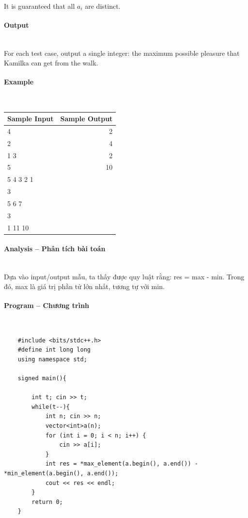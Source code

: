 \documentclass{article}
\begin{document}
It is guaranteed that all $a_i$ are distinct.
\paragraph{Output}\mbox{} \\

For each test case, output a single integer: the maximum possible pleasure that Kamilka can get from the walk.

\paragraph{Example}\mbox{} \\

\begin{table}[h]
    \centering
    \begin{tabular}{|l|r|}
        \hline
        \textbf{Sample Input} & \textbf{Sample Output} \\
        \hline
		4& 2 \\ 
		2& 4 \\ 
		1 3& 2 \\ 
		5& 10 \\ 
		5 4 3 2 1&  \\
		3&  \\ 
		5 6 7&  \\ 
		3&  \\ 
		1 11 10&  \\ 
		 \hline
    \end{tabular}
\end{table}

\paragraph{Analysis -- Phân tích bài toán} \mbox{} \\

Dựa vào input/output mẫu, ta thấy được quy luật rằng: res = max - min. Trong đó, max là giá trị phần tử lớn nhất, tương tự với min.


\paragraph{Program -- Chương trình} \mbox{} \\

\begin{lstlisting}
	#include <bits/stdc++.h>
	#define int long long
	using namespace std;
	
	signed main(){
	
		int t; cin >> t;
		while(t--){
			int n; cin >> n;
			vector<int>a(n);
			for (int i = 0; i < n; i++) {
				cin >> a[i];
			}
			int res = *max_element(a.begin(), a.end()) - *min_element(a.begin(), a.end());
			cout << res << endl;
		}
		return 0;
	}
\end{lstlisting}
\end{document}
